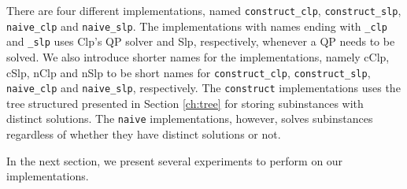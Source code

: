There are four different implementations, named
\texttt{construct\_clp}, \texttt{construct\_slp}, \texttt{naive\_clp} and
\texttt{naive\_slp}. The implementations with names ending with
\texttt{\_clp} and \texttt{\_slp} uses Clp's QP solver and Slp, respectively,
whenever a QP needs to be solved.
We also introduce shorter names for the implementations, namely cClp, cSlp, nClp
and nSlp to be short names for \texttt{construct\_clp}, \texttt{construct\_slp},
\texttt{naive\_clp} and \texttt{naive\_slp}, respectively.
The \texttt{construct} implementations uses the tree structured presented
in Section \ref{ch:tree} for storing subinstances with distinct solutions.
The \texttt{naive} implementations, however, solves subinstances regardless of
whether they have distinct solutions or not.

In the next section, we present several experiments to perform on our
implementations.
